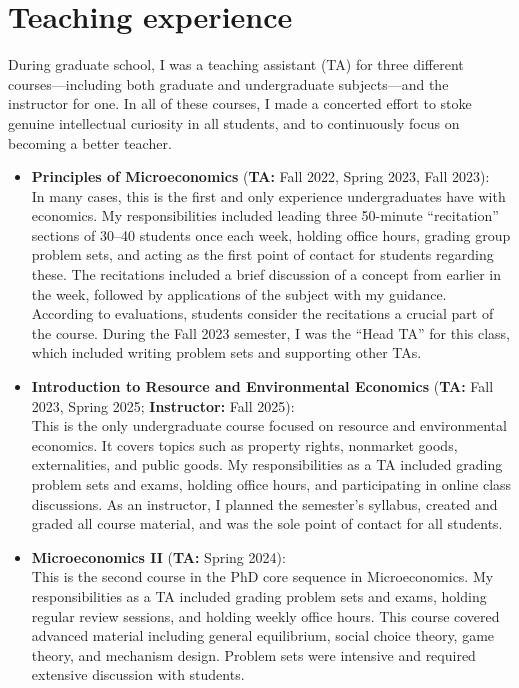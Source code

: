 \documentclass[12pt]{article}
\begin{document}
\section*{Teaching experience}

During graduate school, I was a teaching assistant (TA) for three different courses---including both graduate and undergraduate subjects---and the instructor for one. In all of these courses, I made a concerted effort to stoke genuine intellectual curiosity in all students, and to continuously focus on becoming a better teacher.


\begin{itemize}
    \item \textbf{Principles of Microeconomics} (\textbf{TA:} Fall 2022, Spring 2023, Fall 2023): \\
    In many cases, this is the first and only experience undergraduates have with economics. My responsibilities included leading three 50-minute ``recitation'' sections of 30--40 students once each week, holding office hours, grading group problem sets, and acting as the first point of contact for students regarding these. The recitations included a brief discussion of a concept from earlier in the week, followed by applications of the subject with my guidance. According to evaluations, students consider the recitations a crucial part of the course. During the Fall 2023 semester, I was the ``Head TA'' for this class, which included writing problem sets and supporting other TAs.
    \item \textbf{Introduction to Resource and Environmental Economics} (\textbf{TA:} Fall 2023, Spring 2025; \textbf{Instructor:} Fall 2025): \\
    This is the only undergraduate course focused on resource and environmental economics. It covers topics such as property rights, nonmarket goods, externalities, and public goods. My responsibilities as a TA included grading problem sets and exams, holding office hours, and participating in online class discussions. As an instructor, I planned the semester's syllabus, created and graded all course material, and was the sole point of contact for all students. 
    \item \textbf{Microeconomics II} (\textbf{TA:} Spring 2024): \\
    This is the second course in the PhD core sequence in Microeconomics. My responsibilities as a TA included grading problem sets and exams, holding regular review sessions, and holding weekly office hours. This course covered advanced material including general equilibrium, social choice theory, game theory, and mechanism design. Problem sets were intensive and required extensive discussion with students.
\end{itemize}
\end{document}
